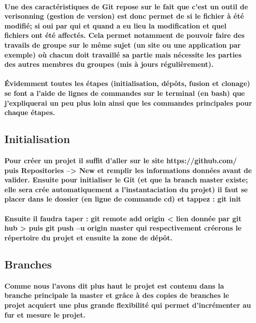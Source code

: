 \documentclass[a4paper, 12pt, twoside]{article}
\begin{document}
\paragraph{Une des caractéristiques de Git repose sur le fait que c'est un outil de verisonning (gestion de version) est donc permet de si le fichier
à été modifié; si oui par qui et quand a eu lieu la modification et quel fichiers ont été affectés. Cela permet notamment de pouvoir faire
des travails de groupe sur le même sujet (un site ou une application par exemple) où chacun doit travaillé sa partie mais nécessite les parties 
des autres membres du groupes (mis à jours régulièrement). }

\paragraph{Évidemment toutes les étapes (initialisation, dépôts, fusion et clonage) se font a l'aide de lignes de commandes sur le terminal (en bash) que j'expliquerai un peu plus loin ainsi que les commandes principales pour chaque étapes.}

\subsection{Initialisation}
\paragraph{ Pour créer un projet il suffit d'aller sur le site  https://github.com/ puis Repositories --> New et remplir les informations données avant
de valider. Ensuite pour initialiser le Git (et que la branch master existe; elle sera crée automatiquement a l'instantaciation du projet) il faut se placer dans le dossier (en ligne de commande cd) et tappez :  git init}

\paragraph{Ensuite  il faudra taper :  git remote add origin < lien donnée par git hub >  puis  git push –u origin master  qui respectivement créerons le répertoire du projet et ensuite la zone de dépôt.}

\subsection{Branches}
\paragraph{Comme nous l'avons dit plus haut le projet est contenu dans la branche principale la master et grâce à des copies de branches le projet 
acquiert une plus grande flexibilité qui permet d'incrémenter au fur et mesure le projet.}
\end{document}
